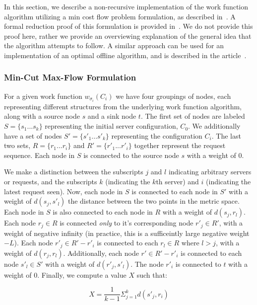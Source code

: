 In this section, we describe a non-recursive implementation of the work function algorithm utilizing a min cost flow problem formulation, as described in~\cite{mcfp2011}. A formal reduction proof of this formulation is provided in~\cite{mcfp2011}. We do not provide this proof here, rather we provide an overviewing explanation of the general idea that the algorithm attempts to follow. A similar approach can be used for an implementation of an optimal offline algorithm, and is described in the article~\cite{mcfp2011}.

\subsubsection*{Min-Cut Max-Flow Formulation}
For a given work function $w_{\sigma_i}(C_i)$ we have four groupings of nodes, each representing different structures from the underlying work function algorithm, along with a source node $s$ and a sink node $t$. The first set of nodes are labeled $S = \{s_1 ... s_k\}$ representing the initial server configuration, $C_0$. We additionally have a set of nodes $S' = \{s'_1 ... s'_k\}$ representing the configuration $C_i$. The last two sets, $R = \{r_1 ... r_i\}$ and $R' = \{r'_1 ... r'_i\}$ together represent the request sequence. Each node in $S$ is connected to the source node $s$ with a weight of $0$.

We make a distinction between the subscripts $j$ and $l$ indicating arbitrary servers or requests, and the subscripts $k$ (indicating the $k$th server) and $i$ (indicating the latest request seen). Now, each node in $S$ is connected to each node in $S'$ with a weight of $d(s_j, s'_l)$ the distance between the two points in the metric space. Each node in $S$ is also connected to each node in $R$ with a weight of $d(s_j, r_l)$. Each node $r_j \in R$ is connected \textit{only} to it's corresponding node $r'_j\in R'$, with a weight of negative infinity (in practice, this is a sufficeintly large negative weight $-L$). Each node $r'_j \in R' - r'_i$ is connected to each $r_l \in R$ where $l > j$, with a weight of $d(r_j, r_l)$. Additionally, each node $r' \in R'-r'_i$ is connected to each node $s'_l \in S'$ with a weight of $d(r'_j, s'_l)$. The node $r'_i$ is connected to $t$ with a weight of $0$. Finally, we compute a value $X$ such that:

\begin{equation*}
    X = \frac{1}{k-1} \Sigma_{j=1}^{k} d(s'_j, r_i)
\end{equation*}

